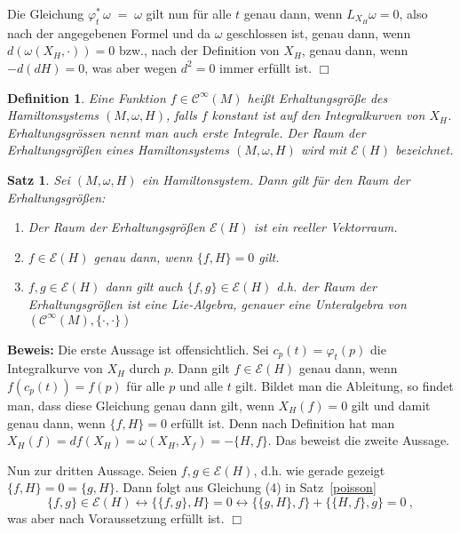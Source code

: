 \documentclass[12pt,a4paper]{article}
\newtheorem{Satz}[Lemma]{Satz}
\newtheorem{Definition}[Lemma]{Definition}
\def\proof{\noindent\textbf{Beweis:}\quad}
\def\qed{\quad\hfill\ensuremath{\Box}}
\begin{document}
\medskip

Die Gleichung $\varphi^*_t \,\omega \;=\; \omega $ gilt nun f\"ur alle $t$ genau dann, wenn
$L_{X_H}\omega = 0$, also nach der angegebenen Formel und da $\omega$ geschlossen ist, genau dann, wenn
$d (\omega(X_H, \cdot)) = 0$ bzw., nach der Definition von $X_H$, genau dann, wenn $- d (d H) = 0$, was
aber wegen $d^2=0$ immer erf\"ullt ist.
\qed

\bigskip

\begin{Definition}
Eine Funktion $f\in \mathcal C^\infty(M)$ hei\ss t {\em Erhaltungsgr\"o\ss e} des
Hamilton\-systems $(M, \omega, H)$, falls $f$ konstant ist auf den Integralkurven
von $X_H$. Erhaltungs\-gr\"ossen nennt man auch {\em erste Integrale}. Der Raum der
Erhaltungsgr\"o\ss en eines Hamiltonsystems $(M, \omega, H)$  wird mit
$\mathcal E(H)$ bezeichnet.
\end{Definition}

\bigskip

\begin{Satz}
Sei $(M, \omega, H)$ ein Hamiltonsystem. Dann gilt f\"ur den Raum der Erhaltungsgr\"o\ss en:
\begin{enumerate}
\item
 Der Raum der Erhaltungsgr\"o\ss en $\mathcal E(H)$ ist ein reeller Vektorraum.
\item
 $f\in \mathcal E(H)$ genau dann, wenn $\{f, H\} = 0$ gilt.
\item
 $f, g \in \mathcal E(H)$ dann gilt auch $\{f, g\} \in \mathcal E(H)$
        d.h. der Raum der Erhaltungsgr\"o\ss en ist eine Lie-Algebra, genauer eine Unteralgebra
       von $(\mathcal C^\infty(M), \{\cdot, \cdot\})$
\end{enumerate}
\end{Satz}
\proof
Die erste Aussage ist offensichtlich.
Sei $c_p(t) = \varphi_t(p)$ die Integralkurve von $X_H$ durch $p$. Dann gilt $f\in \mathcal E (H)$
genau dann, wenn $f(c_p(t))=f(p)$ f\"ur alle $p$ und alle $t$ gilt. Bildet man die Ableitung, so
findet man, dass diese Gleichung genau dann gilt, wenn $X_H(f)=0$ gilt und damit genau dann,
wenn $\{f, H\}= 0$ erf\"ullt ist. Denn nach Definition hat man
$X_H(f) = df (X_H) = \omega(X_H, X_f) = - \{H, f\}$. Das beweist die zweite Aussage.

\medskip

Nun zur dritten Aussage.
Seien $f, g \in \mathcal E(H)$, d.h. wie gerade gezeigt $\{f, H\} = 0 = \{g, H\}$. Dann folgt
aus Gleichung (4) in Satz~\ref{poisson}
$$
\{f,g\} \in \mathcal E (H) \leftrightarrow \{\{f,g\}, H\} = 0 \leftrightarrow
\{ \{g, H\}, f\} + \{\{H,f\}, g\}=0 \ ,
$$
was aber nach Voraussetzung erf\"ullt ist.
\qed
\end{document}
